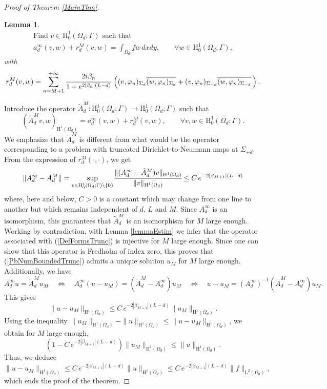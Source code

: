 \documentclass[11pt,a4paper]{report}
\newcommand{\dsp}{\displaystyle}
\newcommand{\Om}{\Omega}
\newcommand{\mrm}[1]{\mathrm{#1}}
\newcommand{\mH}{\mrm{H}}
\newtheorem{lemma}[theorem]{Lemma}
\begin{document}
\begin{proof}[Proof of Theorem \ref{MainThm}]
\begin{lemma}
\begin{equation}
\begin{array}{|l}
\mbox{Find }v\in\mH^1_0(\Om_d;\Gamma) \mbox{ such that }\\[3pt]
a^{\infty}_d(v,w)+r^M_d(v,w)=\dsp\int_{\Om_d}f\overline{w}\,dxdy,\qquad \forall w\in\mH^1_0(\Om_d;\Gamma),
\end{array}
\end{equation}
with 
\[
r^M_d(v,w)=\sum_{n=M+1}^{+\infty}\cfrac{2i\beta_n}{1+e^{2|\beta_n|(L-d)}}\,\left(
(v,\varphi_n)_{\Sigma_{d}}\overline{(w,\varphi_n)_{\Sigma_{ d}}}+(v,\varphi_n)_{\Sigma_{- d}}\overline{(w,\varphi_n)_{\Sigma_{- d}}}\,\right).
\]
\end{lemma}
\noindent Introduce the operator $\tilde{A}^M_d:\mH^1_0(\Om_d;\Gamma)\to \mH^1_0(\Om_d;\Gamma)$ such that
\[
(\tilde{A}^M_d v,w)_{\mH^1(\Om_d)} =a^{\infty}_d(v,w)+r^M_d(v,w),\qquad\forall v,w\in \mH^1_0(\Om_d;\Gamma).
\]
We emphasize that $\tilde{A}^M_d$ is different from what would be the operator corresponding to a problem with truncated Dirichlet-to-Neumann maps at $\Sigma_{\pm d}$. From the expression of $r^M_d(\cdot,\cdot)$, we get
\[
\|A^\infty_d-\tilde{A}^M_d\| = \underset{ v\in\mH^1_0(\Om_d;\Gamma)\setminus\{0\}}{\sup} \cfrac{\|(A^\infty_d-\tilde{A}^M_d)v\|_{\mH^1(\Om_d)}}{\|v\|_{\mH^1(\Om_d)}} \le C\,e^{-2|\beta_{M+1}|(L-d)}
\]
where, here and below, $C>0$ is a constant which may change from one line to another but which remains independent of $d$, $L$ and $M$. Since $A^\infty_d$ is an isomorphism, this guarantees that $\tilde{A}^M_d$ is an isomorphism for $M$ large enough. Working by contradiction, with Lemma \ref{lemmaEstim} we infer that the operator associated with (\ref{DefFormsTrunc}) is injective for $M$ large enough. Since one can show that this operator is Fredholm of index zero, this proves that (\ref{PbNumBoundedTrunc}) admits a unique solution $u_M$ for $M$ large enough. Additionally, we have 
\[
A^\infty_d u=\tilde{A}^M_d u_M\quad\Leftrightarrow\quad A^\infty_d(u-u_M)=(\tilde{A}^M_d-A^\infty_d) u_M \quad\Leftrightarrow\quad u-u_M=(A^\infty_d)^{-1}(\tilde{A}^M_d-A^\infty_d) u_M.
\]
This gives
\[
\|u-u_M\|_{\mH^1(\Om_d)} \le C\,e^{-2|\beta_{M+1}|(L-d)}\|u_M\|_{\mH^1(\Om_d)}.
\]
Using the inequality $\|u_M\|_{\mH^1(\Om_d)}-\|u\|_{\mH^1(\Om_d)} \le \|u-u_M\|_{\mH^1(\Om_d)} $, we obtain for $M$ large enough,
\begin{equation}\label{EstimInterErrEstim}
(1-C\,e^{-2|\beta_{M+1}|(L-d)})\|u_M\|_{\mH^1(\Om_d)} \le \|u\|_{\mH^1(\Om_d)}.
\end{equation}
Thus, we deduce
\[
\|u-u_M\|_{\mH^1(\Om_d)} \le C\,e^{-2|\beta_{M+1}|(L-d)}\|u\|_{\mH^1(\Om_d)} \le  C\,e^{-2|\beta_{M+1}|(L-d)}\|f\|_{\mrm{L}^2(\Om_d)},
\] 
which ends the proof of the theorem.
\end{proof}
\end{document}
